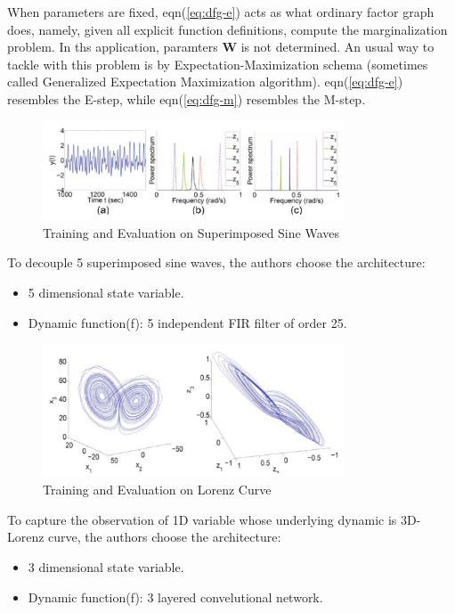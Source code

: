 \documentclass[11pt,a4paper]{article}
\begin{document}
When parameters are fixed, eqn(\ref{eq:dfg-e}) acts as what ordinary 
factor graph does, namely, given all explicit function definitions, 
compute the marginalization problem. In ths application, paramters $\mathbf{W}$
is not determined. An usual way to tackle with this problem is 
by Expectation-Maximization schema (sometimes called Generalized Expectation 
Maximization algorithm). eqn(\ref{eq:dfg-e}) resembles the E-step, while 
eqn(\ref{eq:dfg-m}) resembles the M-step. 

\begin{figure}[htb]
\centering
	\includegraphics[width=0.8\textwidth]{fig/mirowski2009-sine.png}
	\caption{Training and Evaluation on Superimposed Sine Waves}
\end{figure}

To decouple 5 superimposed sine waves, the authors choose the architecture:
\begin{itemize}
	\item 5 dimensional state variable. 
	\item Dynamic function(f): 5 independent FIR filter of order 25. 
\end{itemize}

\begin{figure}[htb]
\centering
	\includegraphics[width=0.8\textwidth]{fig/mirowski2009-Lorenz.png}
	\caption{Training and Evaluation on Lorenz Curve}
\end{figure}
To capture the observation of 1D variable whose underlying 
dynamic is 3D-Lorenz curve, the authors choose the architecture:
\begin{itemize}
	\item 3 dimensional state variable. 
	\item Dynamic function(f): 3 layered convelutional network. 
\end{itemize}
\end{document}
